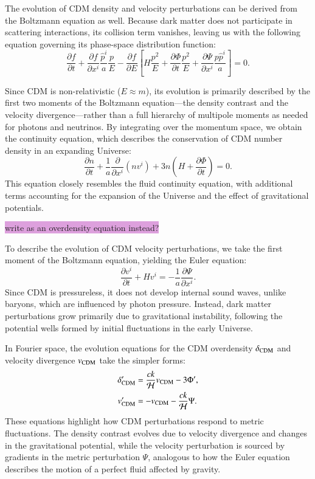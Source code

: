 \documentclass{aa}
\numberwithin{equation}{section}
\numberwithin{table}{section}
\numberwithin{figure}{section}
\begin{document}
The evolution of CDM density and velocity perturbations can be derived from the Boltzmann equation as well. Because dark matter does not participate in scattering interactions, its collision term vanishes, leaving us with the following equation governing its phase-space distribution function:
\begin{equation}
\frac{\partial f}{\partial t} + \frac{\partial f}{\partial x^i} \frac{\hat{p}^i}{a} \frac{p}{E} - \frac{\partial f}{\partial E} \left[ H \frac{p^2}{E} + \frac{\partial \Phi}{\partial t} \frac{p^2}{E} + \frac{\partial \Psi}{\partial x^i} \frac{p \hat{p}^i}{a} \right] = 0.
\end{equation}

Since CDM is non-relativistic ($E \approx m$), its evolution is primarily described by the first two moments of the Boltzmann equation—the density contrast and the velocity divergence—rather than a full hierarchy of multipole moments as needed for photons and neutrinos. By integrating over the momentum space, we obtain the continuity equation, which describes the conservation of CDM number density in an expanding Universe:
\begin{equation}
\frac{\partial n}{\partial t} + \frac{1}{a} \frac{\partial}{\partial x^i} \left(n v^i\right) + 3 n \left(H + \frac{\partial \Phi}{\partial t} \right) = 0.
\end{equation}
This equation closely resembles the fluid continuity equation, with additional terms accounting for the expansion of the Universe and the effect of gravitational potentials. 

\colorbox{Plum}{write as an overdensity equation instead?}

To describe the evolution of CDM velocity perturbations, we take the first moment of the Boltzmann equation, yielding the Euler equation:
\begin{equation}
\frac{\partial v^i}{\partial t} + H v^i = -\frac{1}{a} \frac{\partial \Psi}{\partial x^i}.
\end{equation}
Since CDM is pressureless, it does not develop internal sound waves, unlike baryons, which are influenced by photon pressure. Instead, dark matter perturbations grow primarily due to gravitational instability, following the potential wells formed by initial fluctuations in the early Universe.

In Fourier space, the evolution equations for the CDM overdensity $\delta_{\rm CDM}$ and velocity divergence $v_{\rm CDM}$ take the simpler forms:
\begin{align}
\delta_{\rm CDM}' &= \frac{c k}{\mathcal{H}} v_{\rm CDM} - 3 \Phi', \\
v_{\rm CDM}' &= - v_{\rm CDM} - \frac{c k}{\mathcal{H}} \Psi.
\end{align}
These equations highlight how CDM perturbations respond to metric fluctuations. The density contrast evolves due to velocity divergence and changes in the gravitational potential, while the velocity perturbation is sourced by gradients in the metric perturbation $\Psi$, analogous to how the Euler equation describes the motion of a perfect fluid affected by gravity. 
\end{document}
